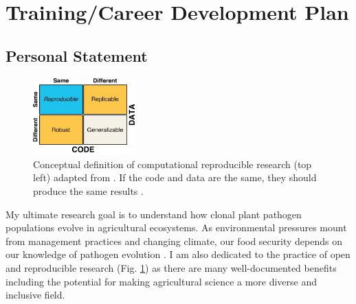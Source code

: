 \documentclass[12pt,letterpaper]{article}
\title{\ruleline{Project Narrative}}
\begin{document}
\maketitle


\section{Training/Career Development Plan}


\subsection{Personal Statement}

\begin{figure}
  \includegraphics[width=0.35\textwidth]{figure/whitaker2017publishing.pdf}
  \caption{Conceptual definition of computational reproducible research (top left) adapted from \citet{whitaker2017publishing}. If the code and data are the same, they should produce the same results \citep{patil2016statistical}.
  }
  \label{fig:rr-def}
\end{figure}


My ultimate research goal is to understand how clonal plant pathogen populations evolve in agricultural ecosystems.
As environmental pressures mount from management practices and changing climate, our food security depends on our knowledge of pathogen evolution \citep{croll2016genetic,grunwald2016population,stukenbrock2013evolution}.
I am also dedicated to the practice of open and reproducible research (Fig. \ref{fig:rr-def}) as there are many well-documented benefits \citep{mckiernan2016open} including the potential for making agricultural science a more diverse and inclusive field.
\end{document}
